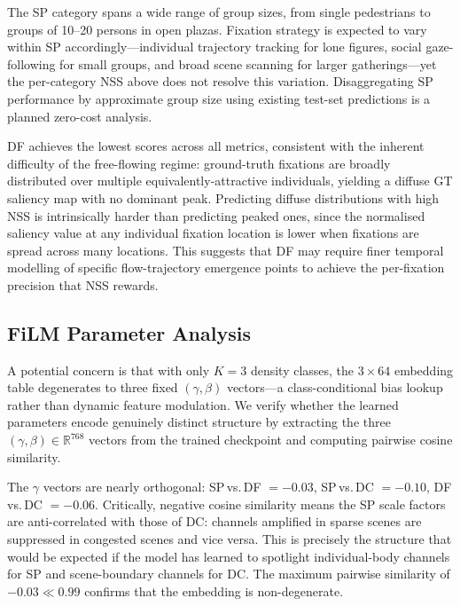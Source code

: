 \documentclass[twocolumn]{article}
\begin{document}
The SP category spans a wide range of group sizes, from single pedestrians
to groups of 10--20 persons in open plazas.  Fixation strategy is expected
to vary within SP accordingly---individual trajectory tracking for lone
figures, social gaze-following for small groups, and broad scene scanning
for larger gatherings---yet the per-category NSS above does not resolve
this variation.  Disaggregating SP performance by approximate group size
using existing test-set predictions is a planned zero-cost analysis.

DF achieves the lowest scores across all metrics, consistent with the
inherent difficulty of the free-flowing regime: ground-truth fixations are
broadly distributed over multiple equivalently-attractive individuals, yielding
a diffuse GT saliency map with no dominant peak.  Predicting diffuse
distributions with high NSS is intrinsically harder than predicting peaked
ones, since the normalised saliency value at any individual fixation location
is lower when fixations are spread across many locations.  This suggests
that DF may require finer temporal modelling of specific flow-trajectory
emergence points to achieve the per-fixation precision that NSS rewards.

\subsection{FiLM Parameter Analysis}
\label{sec:film_analysis}

A potential concern is that with only $K\!=\!3$ density classes, the
$3\!\times\!64$ embedding table degenerates to three fixed $(\gamma,\beta)$
vectors---a class-conditional bias lookup rather than dynamic feature
modulation.  We verify whether the learned parameters encode genuinely
distinct structure by extracting the three $(\gamma,\beta)\!\in\!\mathbb{R}^{768}$
vectors from the trained checkpoint and computing pairwise cosine similarity.

The $\gamma$ vectors are nearly orthogonal: SP\,vs.\,DF $= -0.03$,
SP\,vs.\,DC $= -0.10$, DF\,vs.\,DC $= -0.06$.  Critically, negative
cosine similarity means the SP scale factors are anti-correlated with
those of DC: channels amplified in sparse scenes are suppressed in
congested scenes and vice versa.  This is precisely the structure
that would be expected if the model has learned to spotlight
individual-body channels for SP and scene-boundary channels for DC.
The maximum pairwise similarity of $-0.03 \ll 0.99$ confirms that
the embedding is non-degenerate.
\end{document}
